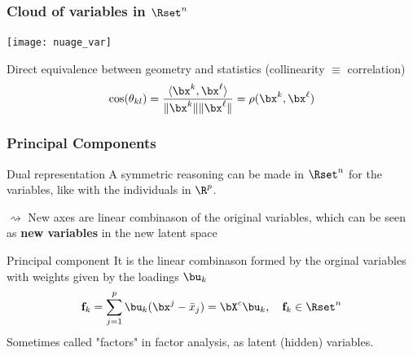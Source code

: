 \documentclass{beamer}\usepackage[]{graphicx}\usepackage[]{color}
\begin{document}
\begin{frame}
  \frametitle{Cloud of variables in $\Rset^n$}
  
  \begin{center}
    \texttt{[image: nuage\_var]}
  \end{center}

  Direct equivalence between geometry and statistics (collinearity $\equiv$ correlation) 
  \begin{equation*}
    \cos(\theta_{kl}) = \frac{\langle \bx^k ,\bx^\ell \rangle}{\|\bx^k\| \|\bx^\ell\|} = \rho(\bx^k,\bx^\ell)
  \end{equation*}

\end{frame}

\begin{frame}
  \frametitle{Principal Components}
  
  \begin{block}{Dual representation}
    A symmetric reasoning can be made in $\Rset^n$ for the variables, like with the individuals in $\R^p$.
    
    $\rightsquigarrow$ New axes are linear combinason of the original variables, which can be seen as \alert{\bf new variables} in the new latent space
  \end{block}

  \begin{block}{Principal component}
    It is the linear combinason formed by the orginal variables with weights given by the loadings $\bu_k$
    \begin{equation*}
      \mathbf{f}_{k}  = \sum_{j=1}^p \bu_k (\bx^{j} - \bar{x}_j) = \bX^c \bu_k, \quad \mathbf{f}_k \in \Rset^n
    \end{equation*}
    Sometimes called \alert{"factors"} in  factor analysis, as \alert{latent (hidden) variables}. 
  \end{block}

\end{frame}
\end{document}
